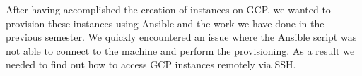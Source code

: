 After having accomplished the creation of instances on GCP, we wanted
to provision these instances using Ansible and the work we have done
in the previous semester. We quickly encountered an issue where the
Ansible script was not able to connect to the machine and perform the
provisioning. As a result we needed to find out how to access GCP
instances remotely via SSH.
